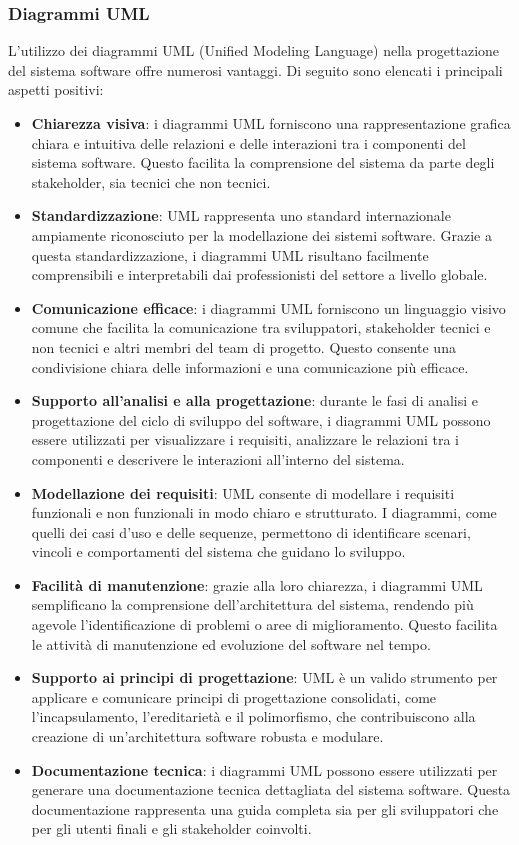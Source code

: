 \subsubsection{Diagrammi UML}
L'utilizzo dei diagrammi UML (Unified Modeling Language) nella progettazione del sistema software offre numerosi vantaggi. Di seguito sono elencati i principali aspetti positivi:
\begin{itemize}
    \item \textbf{Chiarezza visiva}: i diagrammi UML forniscono una rappresentazione grafica chiara e intuitiva delle relazioni e delle interazioni tra i componenti del sistema software. Questo facilita la comprensione del sistema da parte degli stakeholder, sia tecnici che non tecnici.
    \item \textbf{Standardizzazione}: UML rappresenta uno standard internazionale ampiamente riconosciuto per la modellazione dei sistemi software. Grazie a questa standardizzazione, i diagrammi UML risultano facilmente comprensibili e interpretabili dai professionisti del settore a livello globale.
    \item \textbf{Comunicazione efficace}: i diagrammi UML forniscono un linguaggio visivo comune che facilita la comunicazione tra sviluppatori, stakeholder tecnici e non tecnici e altri membri del team di progetto. Questo consente una condivisione chiara delle informazioni e una comunicazione più efficace.
    \item \textbf{Supporto all'analisi e alla progettazione}: durante le fasi di analisi e progettazione del ciclo di sviluppo del software, i diagrammi UML possono essere utilizzati per visualizzare i requisiti, analizzare le relazioni tra i componenti e descrivere le interazioni all'interno del sistema.
    \item \textbf{Modellazione dei requisiti}: UML consente di modellare i requisiti funzionali e non funzionali in modo chiaro e strutturato. I diagrammi, come quelli dei casi d'uso e delle sequenze, permettono di identificare scenari, vincoli e comportamenti del sistema che guidano lo sviluppo.
    \item \textbf{Facilità di manutenzione}: grazie alla loro chiarezza, i diagrammi UML semplificano la comprensione dell'architettura del sistema, rendendo più agevole l'identificazione di problemi o aree di miglioramento. Questo facilita le attività di manutenzione ed evoluzione del software nel tempo.
    \item \textbf{Supporto ai principi di progettazione}: UML è un valido strumento per applicare e comunicare principi di progettazione consolidati, come l'incapsulamento, l'ereditarietà e il polimorfismo, che contribuiscono alla creazione di un'architettura software robusta e modulare.
    \item \textbf{Documentazione tecnica}: i diagrammi UML possono essere utilizzati per generare una documentazione tecnica dettagliata del sistema software. Questa documentazione rappresenta una guida completa sia per gli sviluppatori che per gli utenti finali e gli stakeholder coinvolti.
\end{itemize}

